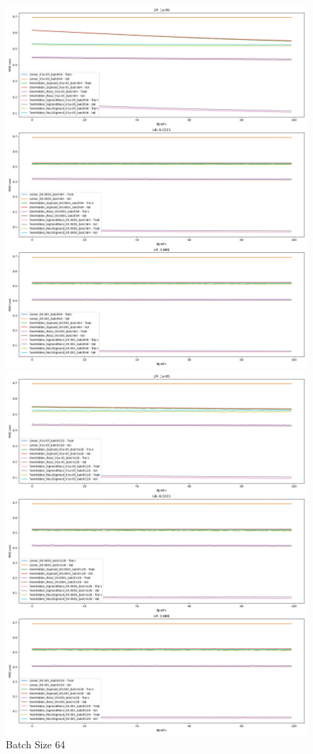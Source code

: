 \begin{figure}[!htbp]
\begin{minipage}{0.32\linewidth}
        \includegraphics[width=\linewidth]{crossentropy_batch64.png}
        \caption{Batch Size 64}
    \end{minipage}
    \hfill
    \begin{minipage}{0.32\linewidth}
        \includegraphics[width=\linewidth]{crossentropy_batch128.png}

\end{minipage}
\end{figure}
